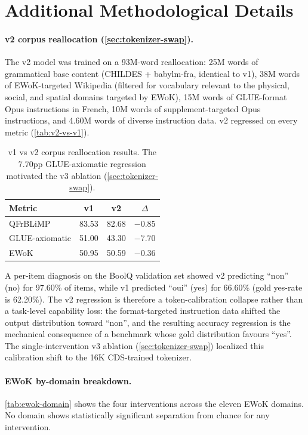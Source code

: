 \documentclass[11pt]{article}
\begin{document}
\section{Additional Methodological Details}
\label{app:methodo}

\paragraph{v2 corpus reallocation (\autoref{sec:tokenizer-swap}).} The v2 model was trained on a 93M-word reallocation: 25M words of grammatical base content (CHILDES + babylm-fra, identical to v1), 38M words of EWoK-targeted Wikipedia (filtered for vocabulary relevant to the physical, social, and spatial domains targeted by EWoK), 15M words of GLUE-format Opus instructions in French, 10M words of supplement-targeted Opus instructions, and 4.60M words of diverse instruction data. v2 regressed on every metric (\autoref{tab:v2-vs-v1}).

\begin{table}[h]
\centering
\begin{tabular}{lccc}
\toprule
Metric & v1 & v2 & $\Delta$ \\
\midrule
QFrBLiMP & 83.53 & 82.68 & $-0.85$ \\
GLUE-axiomatic & 51.00 & 43.30 & $-7.70$ \\
EWoK & 50.95 & 50.59 & $-0.36$ \\
\bottomrule
\end{tabular}
\caption{v1 vs v2 corpus reallocation results. The 7.70pp GLUE-axiomatic regression motivated the v3 ablation (\autoref{sec:tokenizer-swap}).}
\label{tab:v2-vs-v1}
\end{table}

\noindent A per-item diagnosis on the BoolQ validation set showed v2 predicting \enquote{non} (no) for 97.60\% of items, while v1 predicted \enquote{oui} (yes) for 66.60\% (gold yes-rate is 62.20\%). The v2 regression is therefore a token-calibration collapse rather than a task-level capability loss: the format-targeted instruction data shifted the output distribution toward \enquote{non}, and the resulting accuracy regression is the mechanical consequence of a benchmark whose gold distribution favours \enquote{yes}. The single-intervention v3 ablation (\autoref{sec:tokenizer-swap}) localized this calibration shift to the 16K CDS-trained tokenizer.

\paragraph{EWoK by-domain breakdown.} \autoref{tab:ewok-domain} shows the four interventions across the eleven EWoK domains. No domain shows statistically significant separation from chance for any intervention.
\end{document}
